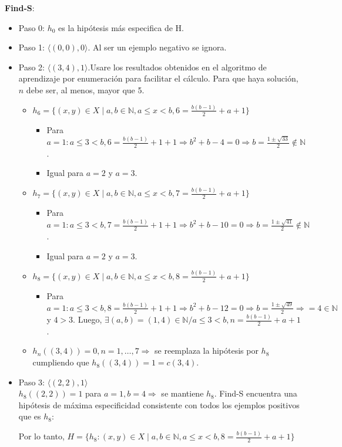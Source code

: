 \documentclass{article}
\begin{document}
\textbf{Find-S}: 
\begin{itemize}
    \item Paso 0: \(h_0\) es la hipótesis más especifica de H.
    \item Paso 1: \(\langle(0, 0), 0\rangle\). Al ser un ejemplo negativo se ignora.
    \item Paso 2: \(\langle(3, 4), 1\rangle\).Usare los resultados obtenidos en el algoritmo de aprendizaje por enumeración para facilitar el cálculo. Para que haya solución, \(n\) debe ser, al menos, mayor que 5.
    \begin{itemize}
        \item \(h_6 = \{(x, y) \in X \mid a, b \in \mathbb N, a \leq x < b, 6 = \frac{b(b-1)}{2} + a + 1\}\)
        \begin{itemize}
            \item Para \(a = 1: a \leq 3 < b, 6 = \frac{b(b-1)}{2} + 1 + 1 \Rightarrow b^2 + b - 4 = 0 \Rightarrow b = \frac{1\pm\sqrt{33}}{2} \notin \mathbb N\).
            \item Igual para \(a = 2\) y \(a = 3\).
        \end{itemize}
        \item \(h_7 = \{(x, y) \in X \mid a, b \in \mathbb N, a \leq x < b, 7 = \frac{b(b-1)}{2} + a + 1\}\)
        \begin{itemize}
            \item Para \(a = 1: a \leq 3 < b, 7 = \frac{b(b-1)}{2} + 1 + 1 \Rightarrow b^2 + b - 10 = 0 \Rightarrow b = \frac{1\pm\sqrt{41}}{2} \notin \mathbb N\).
            \item Igual para \(a = 2\) y \(a = 3\).
        \end{itemize}
        \item \(h_8 = \{(x, y) \in X \mid a, b \in \mathbb N, a \leq x < b, 8 = \frac{b(b-1)}{2} + a + 1\}\)
        \begin{itemize}
            \item Para \(a = 1: a \leq 3 < b, 8 = \frac{b(b-1)}{2} + 1 + 1 \Rightarrow b^2 + b - 12 = 0 \Rightarrow b = \frac{1\pm\sqrt{49}}{2} \Rightarrow = 4 \in \mathbb N\) y \(4 > 3\).
            Luego, \(\exists(a,b) = (1,4)\in \mathbb N / a \leq 3 < b, n= \frac{b(b-1)}{2}+a+1\).
        \end{itemize}
    \item \(h_n ((3, 4)) = 0, n = 1, \ldots, 7 \Rightarrow\) se reemplaza la hipótesis por \(h_8\) cumpliendo que \(h_8((3, 4)) = 1 = c(3, 4)\).
    \end{itemize}
\item Paso 3: \(\langle(2, 2), 1\rangle\)
\\\(h_8 ((2, 2)) = 1\) para \(a = 1, b = 4 \Rightarrow\) se mantiene \(h_8\).
Find-S encuentra una hipótesis de máxima especificidad consistente con todos los ejemplos positivos que es \(h_8\):
\begin{center}
Por lo tanto, \(H = \{h_8 : (x, y) \in X \mid a, b \in \mathbb N, a \leq x < b, 8 = \frac{b(b-1)}{2} + a + 1\}\)
\end{center}
\end{itemize}
\end{document}
